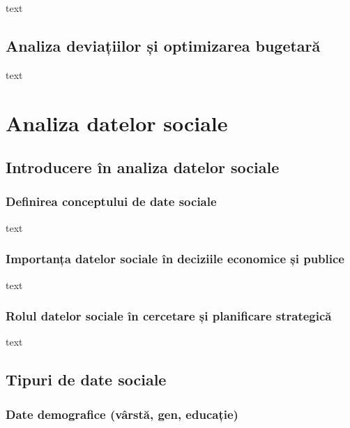 \documentclass[
  11pt,
  b5paper,
  nottoc]{book}
\begin{document}
text

\section{Analiza deviațiilor și optimizarea
bugetară}\label{analiza-deviaux21biilor-ux219i-optimizarea-bugetarux103}

text


\chapter{Analiza datelor sociale}\label{cap6}

\section{Introducere în analiza datelor
sociale}\label{introducere-uxeen-analiza-datelor-sociale}

\subsection{Definirea conceptului de date
sociale}\label{definirea-conceptului-de-date-sociale}

text

\subsection{Importanța datelor sociale în deciziile economice și
publice}\label{importanux21ba-datelor-sociale-uxeen-deciziile-economice-ux219i-publice}

text

\subsection{Rolul datelor sociale în cercetare și planificare
strategică}\label{rolul-datelor-sociale-uxeen-cercetare-ux219i-planificare-strategicux103}

text

\section{Tipuri de date sociale}\label{tipuri-de-date-sociale}

\subsection{Date demografice (vârstă, gen,
educație)}\label{date-demografice-vuxe2rstux103-gen-educaux21bie}
\end{document}
